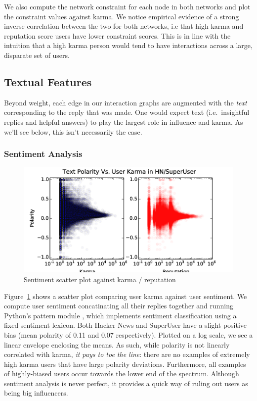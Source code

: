 \documentclass[11pt]{article}
\begin{document}
We also compute the network constraint for each node in both networks and plot
the constraint values against karma. We notice empirical evidence of a strong
inverse correlation between the two for both networks, i.e that high karma and
reputation score users have lower constraint scores. This is in line with the
intuition that a high karma person would tend to have interactions across a
large, disparate set of users.


\subsection{Textual Features}

Beyond weight, each edge in our interaction graphs are augmented with the
\textit{text} corresponding to the reply that was made. One would expect 
text (i.e.\ insightful replies and helpful answers) to play the largest role 
in influence and karma. As we'll see below, this isn't necessarily the case.

\subsubsection{Sentiment Analysis}
\label{sec:sentiment}
\begin{figure}[h]
\centering
\includegraphics[width=\linewidth]{text_polarity-png}
\caption{Sentiment scatter plot against karma / reputation}
\label{fig:sentiment}
\end{figure}

Figure~\ref{fig:sentiment} shows a scatter plot comparing user karma
against user sentiment. We compute user sentiment concatinating all
their replies together and running Python's pattern module \citet{de2012pattern}, 
which implements sentiment classification using a fixed sentiment lexicon.  Both
Hacker News and SuperUser have a slight positive bias (mean polarity of 0.11 and
0.07 respectively). Plotted on a log scale, we see a linear envelope enclosing
the means. As such, while polarity is not linearly correlated with karma,
\textit{it pays to toe the line}: there are no examples of extremely high karma
users that have large polarity deviations. Furthermore, all examples of
highly-biased users occur towards the lower end of the spectrum. Although
sentiment analysis is never perfect, it provides a quick way of ruling out users
as being big influencers.
\end{document}
